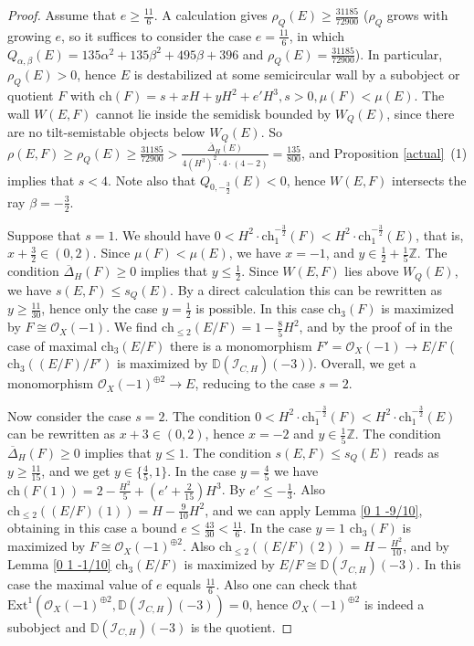 \documentclass{amsart}
\begin{document}
	\begin{proof} Assume that $e\ge\frac{11}{6}$. A calculation gives $\rho_Q(E)\ge\frac{31185}{72900}$ ($\rho_Q$ grows with growing $e$, so it suffices to consider the case $e=\frac{11}{6}$, in which $Q_{\alpha,\beta}(E)=135\alpha^2+135\beta^2+495\beta+396$ and $\rho_Q(E)=\frac{31185}{72900}$). In particular, $\rho_Q(E)>0$, hence $E$ is destabilized at some semicircular wall by a subobject or quotient $F$ with $\mathrm{ch}(F)=s+xH+yH^2+e'H^3,s>0,\mu(F)<\mu(E)$. The wall $W(E,F)$ cannot lie inside the semidisk bounded by $W_Q(E)$, since there are no tilt-semistable objects below $W_Q(E)$. So $\rho(E,F)\ge\rho_Q(E)\ge\frac{31185}{72900}>\frac{\overline{\Delta}_H(E)}{4(H^3)^2\cdot 4\cdot (4-2)}=\frac{135}{800}$, and Proposition \ref{actual}~(1) implies that $s<4$. Note also that $Q_{0,-\frac 32}(E)<0$, hence $W(E,F)$ intersects the ray $\beta=-\frac 32$.
		
		Suppose that $s=1$. We should have $0<H^2\cdot\mathrm{ch}_1^{-\frac 32}(F)<H^2\cdot\mathrm{ch}_1^{-\frac 32}(E)$, that is, $x+\frac 32\in(0,2)$. Since $\mu(F)<\mu(E)$, we have $x=-1$, and $y\in\frac 12+\frac 15\mathbb Z$. The condition $\overline{\Delta}_H(F)\ge 0$ implies that $y\le\frac 12$. Since $W(E,F)$ lies above $W_Q(E)$, we have $s(E,F)\le s_Q(E)$. By a direct calculation this can be rewritten as $y\ge\frac{11}{30}$, hence only the case $y=\frac 12$ is possible. In this case $\mathrm{ch}_3(F)$ is maximized by $F\cong\mathcal O_X(-1)$. We find $\mathrm{ch}_{\le 2}(E/F)=1-\frac 85H^2$, and by the proof of \cite[Proposition 3.2]{MS18} in the case of maximal $\mathrm{ch}_3(E/F)$ there is a monomorphism $F'=\mathcal O_X(-1)\to E/F$ ($\mathrm{ch}_3((E/F)/F')$ is maximized by $\mathbb D(\mathcal I_{C,H})(-3)$). Overall, we get a monomorphism $\mathcal O_X(-1)^{\oplus 2}\to E$, reducing to the case $s=2$.
		
		Now consider the case $s=2$. The condition $0<H^2\cdot\mathrm{ch}_1^{-\frac 32}(F)<H^2\cdot\mathrm{ch}_1^{-\frac 32}(E)$ can be rewritten as $x+3\in(0,2)$, hence $x=-2$ and $y\in\frac 15\mathbb Z$. The condition $\overline{\Delta}_H(F)\ge 0$ implies that $y\le 1$. The condition $s(E,F)\le s_Q(E)$ reads as $y\ge\frac{11}{15}$, and we get $y\in\{\frac 45,1\}$. In the case $y=\frac 45$ we have $\mathrm{ch}(F(1))=2-\frac{H^2}{5}+(e'+\frac{2}{15})H^3$. By \cite[Lemma 3.7]{Vass} $e'\le-\frac 13$. Also $\mathrm{ch}_{\le 2}((E/F)(1))=H-\frac{9}{10}H^2$, and we can apply Lemma \ref{0 1 -9/10}, obtaining in this case a bound $e\le\frac{43}{30}<\frac{11}{6}$. In the case $y=1$ $\mathrm{ch}_3(F)$ is maximized by $F\cong\mathcal O_X(-1)^{\oplus 2}$. Also $\mathrm{ch}_{\le 2}((E/F)(2))=H-\frac{H^2}{10}$, and by Lemma \ref{0 1 -1/10} $\mathrm{ch}_3(E/F)$ is maximized by $E/F\cong \mathbb D(\mathcal I_{C,H})(-3)$. In this case the maximal value of $e$ equals $\frac{11}{6}$. Also one can check that $\mathrm{Ext}^1(\mathcal O_X(-1)^{\oplus 2},\mathbb D(\mathcal I_{C,H})(-3))=0$, hence $\mathcal O_X(-1)^{\oplus 2}$ is indeed a subobject and $\mathbb D(\mathcal I_{C,H})(-3)$ is the quotient.
		

\end{proof}
\end{document}

